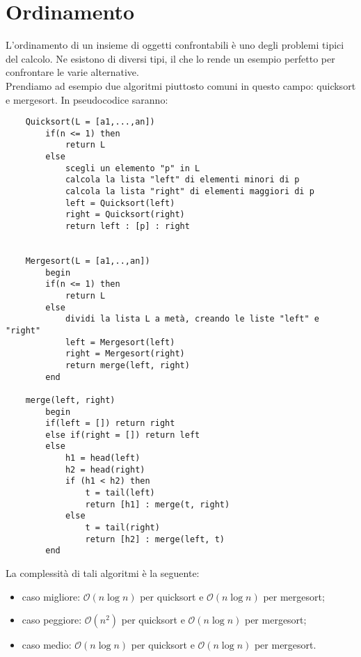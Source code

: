 \section{Ordinamento}
L'ordinamento di un insieme di oggetti confrontabili è uno degli problemi tipici del calcolo. Ne esistono di diversi tipi, il che lo rende un esempio perfetto per confrontare le varie alternative.\\
Prendiamo ad esempio due algoritmi piuttosto comuni in questo campo: quicksort e mergesort. In pseudocodice saranno:
\begin{verbatim}
    Quicksort(L = [a1,...,an])
        if(n <= 1) then
            return L
        else
            scegli un elemento "p" in L
	        calcola la lista "left" di elementi minori di p
	        calcola la lista "right" di elementi maggiori di p
	        left = Quicksort(left)
	        right = Quicksort(right)
	        return left : [p] : right


    Mergesort(L = [a1,..,an])
        begin
        if(n <= 1) then
            return L
        else
            dividi la lista L a metà, creando le liste "left" e "right" 
            left = Mergesort(left)
            right = Mergesort(right)
            return merge(left, right)
        end
        
    merge(left, right)
        begin
        if(left = []) return right
        else if(right = []) return left
        else
            h1 = head(left)
            h2 = head(right)
            if (h1 < h2) then
                t = tail(left)
                return [h1] : merge(t, right)
            else
                t = tail(right)
                return [h2] : merge(left, t)
        end
\end{verbatim}
La complessità di tali algoritmi è la seguente:
\begin{itemize}
\item{caso migliore:  $\mathcal {O}(n \log {}n)$ per quicksort e  $\mathcal {O}(n \log {}n)$ per mergesort;}
\item{caso peggiore:  $\mathcal {O}(n^2)$ per quicksort e  $\mathcal {O}(n \log {}n)$ per mergesort;}
\item{caso medio:  $\mathcal {O}(n \log {}n)$ per quicksort e  $\mathcal {O}(n \log {}n)$ per mergesort.}
\end{itemize}
